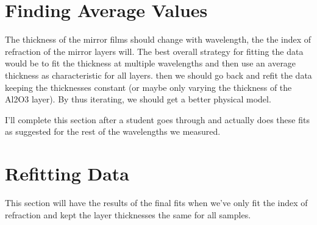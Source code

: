 \documentclass[english]{scrartcl}
\begin{document}
\section{Finding Average Values}\label{sec:avg}
The thickness of the mirror films should change with wavelength, the the
index of refraction of the mirror layers will. The best overall strategy
for fitting the data would be to fit the thickness at multiple wavelengths
and then use an average thickness as characteristic for all layers.
then we should go back and refit the data keeping the thicknesses
constant (or maybe only varying the thickness of the Al2O3 layer).
By thus iterating, we should get a better physical model.

I'll complete this section after a student goes through and actually
does these fits as suggested for the rest of the wavelengths we measured.

\section{Refitting Data}\label{sec:refit}
This section will have the results of the final fits when we've only
fit the index of refraction and kept the layer thicknesses the same
for all samples.

\appendix
\end{document}
